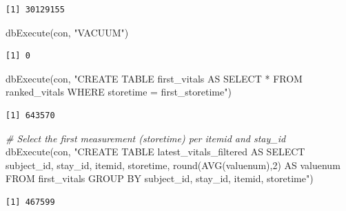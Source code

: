 \documentclass[
]{article}
\newenvironment{Shaded}{\begin{snugshade}}{\end{snugshade}}
\newcommand{\CommentTok}[1]{\textcolor[rgb]{0.56,0.35,0.01}{\textit{#1}}}
\newcommand{\FunctionTok}[1]{\textcolor[rgb]{0.00,0.00,0.00}{#1}}
\newcommand{\NormalTok}[1]{\textcolor[rgb]{0.00,0.00,0.00}{#1}}
\newcommand{\StringTok}[1]{\textcolor[rgb]{0.31,0.60,0.02}{#1}}
\begin{document}
\begin{verbatim}
[1] 30129155
\end{verbatim}

\begin{Shaded}
\begin{Highlighting}[]
\FunctionTok{dbExecute}\NormalTok{(con, }\StringTok{"VACUUM"}\NormalTok{)}
\end{Highlighting}
\end{Shaded}

\begin{verbatim}
[1] 0
\end{verbatim}

\begin{Shaded}
\begin{Highlighting}[]
\FunctionTok{dbExecute}\NormalTok{(con, }\StringTok{"CREATE TABLE first\_vitals AS }
\StringTok{        SELECT * }
\StringTok{        FROM ranked\_vitals}
\StringTok{        WHERE storetime = first\_storetime"}\NormalTok{)}
\end{Highlighting}
\end{Shaded}

\begin{verbatim}
[1] 643570
\end{verbatim}

\begin{Shaded}
\begin{Highlighting}[]
\CommentTok{\# Select the first measurement (\textasciigrave{}storetime\textasciigrave{}) per \textasciigrave{}itemid\textasciigrave{} and \textasciigrave{}stay\_id\textasciigrave{}}
\FunctionTok{dbExecute}\NormalTok{(con, }\StringTok{"CREATE TABLE latest\_vitals\_filtered AS}
\StringTok{    SELECT subject\_id, stay\_id, itemid, storetime, }
\StringTok{    round(AVG(valuenum),2) AS valuenum}
\StringTok{    FROM first\_vitals}
\StringTok{    GROUP BY subject\_id, stay\_id, itemid, storetime"}\NormalTok{)}
\end{Highlighting}
\end{Shaded}

\begin{verbatim}
[1] 467599
\end{verbatim}
\end{document}
